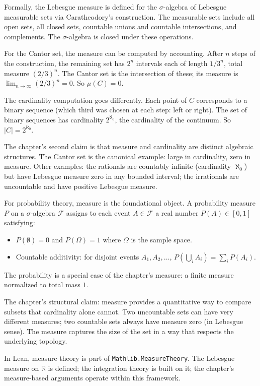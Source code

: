 Formally, the Lebesgue measure is defined for the $\sigma$-algebra
of Lebesgue measurable sets via Caratheodory's construction. The
measurable sets include all open sets, all closed sets, countable
unions and countable intersections, and complements. The
$\sigma$-algebra is closed under these operations.

For the Cantor set, the measure can be computed by accounting.
After $n$ steps of the construction, the remaining set has $2^n$
intervals each of length $1/3^n$, total measure $(2/3)^n$. The
Cantor set is the intersection of these; its measure is
$\lim_{n \to \infty} (2/3)^n = 0$. So $\mu(C) = 0$.

The cardinality computation goes differently. Each point of $C$
corresponds to a binary sequence (which third was chosen at each
step: left or right). The set of binary sequences has cardinality
$2^{\aleph_0}$, the cardinality of the continuum. So $|C| =
2^{\aleph_0}$.

The chapter's second claim is that measure and cardinality are
distinct algebraic structures. The Cantor set is the canonical
example: large in cardinality, zero in measure. Other examples:
the rationals are countably infinite (cardinality $\aleph_0$) but
have Lebesgue measure zero in any bounded interval; the
irrationals are uncountable and have positive Lebesgue measure.

For probability theory, measure is the foundational object.
A probability measure $P$ on a $\sigma$-algebra $\mathcal{F}$
assigns to each event $A \in \mathcal{F}$ a real number $P(A)
\in [0, 1]$ satisfying:
\begin{itemize}
\item $P(\emptyset) = 0$ and $P(\Omega) = 1$ where $\Omega$ is
the sample space.
\item Countable additivity: for disjoint events $A_1, A_2, \ldots$,
$P(\bigcup_i A_i) = \sum_i P(A_i)$.
\end{itemize}
The probability is a special case of the chapter's measure: a
finite measure normalized to total mass $1$.

The chapter's structural claim: measure provides a quantitative
way to compare subsets that cardinality alone cannot. Two
uncountable sets can have very different measures; two
countable sets always have measure zero (in Lebesgue sense). The
measure captures the size of the set in a way that respects the
underlying topology.

In Lean, measure theory is part of \texttt{Mathlib.MeasureTheory}.
The Lebesgue measure on $\mathbb{R}$ is defined; the integration
theory is built on it; the chapter's measure-based arguments
operate within this framework.

